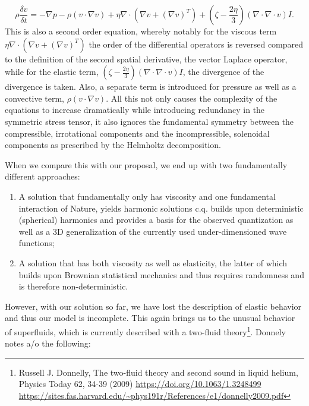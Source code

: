 \documentclass[a4paper]{article}
\newcommand\textstyleNone[1]{#1}
\begin{document}
\begin{equation}
\rho \frac{\mathit{\delta v}}{\mathit{\delta t}}=-{\nabla}p-\rho \left(v\cdot {\nabla}v\right)+\eta {\nabla}\cdot
\left({\nabla}v+\left({\nabla}v\right)^T\right)+\left(\zeta -\frac{2\eta } 3\right)\left({\nabla}\cdot {\nabla}\cdot
v\right)\mathit{I.}
\end{equation}
\textstyleNone{{This is also a second order equation, whereby
notably for the viscous term }} $\eta {\nabla}{\cdot}\left({\nabla}v+\left({\nabla}v\right)^T\right)$
\textstyleNone{{ the order of the differential operators is
reversed compared to the definition of the second
spa}}\textstyleNone{{tial derivative, the vector Laplace operator,
while for the elastic term, }} $\left(\zeta -\frac{2\eta }
3\right)\left({\nabla}{\cdot}{\nabla}{\cdot}v\right)I${,}\textstyleNone{{
the divergence of the divergence is taken. Also, a separate term is introduced for pressure as well as a convective
term, }} $\rho \left(v{\cdot}{\nabla}v\right)${. All
this}\textstyleNone{{ not only causes the complexity of the
equations to increase dramatically while introducing redundancy in the symmetric stress tensor, it also ignores the
fundamental symmetry between the compressible, irrotational components and the incompressible, solenoidal components as
prescribed by the Helmholtz decomposition.}}

\textstyleNone{{When we compare this with our proposal, we end up
with two fundamentally different approaches:}}

\begin{enumerate}
\item {
\textstyleNone{{A solution that
}{fundamentally}{
only }{has}{
viscosity }{and one fundamental interaction of
Nature,}{ yields harmonic solutions c.q. builds upon deterministic
}{(spherical)
}{harmonics
}{and provides a basis for the observed quantization
}{as well as a
}{3D generalization
of}{ the currently used under-dimensioned wave
functions}{;}}}
\item {
\textstyleNone{{A solution that has both viscosity as well as
elasticity, }{the latter of
}{which builds upon
}{Brownian
}{statistical mechanics and thus requires randomness and is
therefore non-deterministic.  }}}
\end{enumerate}
{\color[rgb]{0.101960786,0.101960786,0.101960786}
\textstyleNone{However, with our solution so far, we have lost the description of elastic behavior and thus our model is
incomplete. This again brings us to the unusual behavior of superfluids, which is currently described with a two-fluid
theory}\footnote{ Russell J. Donnelly, {\textquotedbl}The two-fluid theory and second sound in liquid
helium{\textquotedbl}, Physics Today 62, 34-39 (2009) \url{https://doi.org/10.1063/1.3248499}
\url{https://sites.fas.harvard.edu/~phys191r/References/e1/donnelly2009.pdf} \par }\textstyleNone{. Donnely notes a/o
the following: }}
\end{document}
